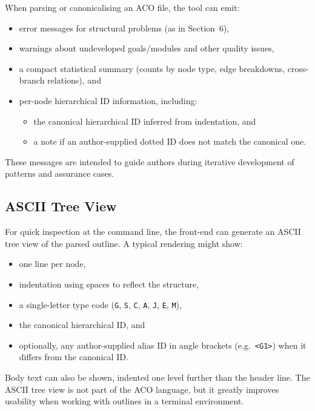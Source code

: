 \documentclass[11pt,twoside,a4paper]{article}
\begin{document}
When parsing or canonicalising an ACO file, the tool can emit:
\begin{itemize}[leftmargin=2em]
  \item error messages for structural problems (as in Section~6),
  \item warnings about undeveloped goals/modules and other quality issues,
  \item a compact statistical summary (counts by node type, edge breakdowns, cross-branch relations), and
  \item per-node hierarchical ID information, including:
    \begin{itemize}[leftmargin=1.5em]
      \item the canonical hierarchical ID inferred from indentation, and
      \item a note if an author-supplied dotted ID does not match the canonical one.
    \end{itemize}
\end{itemize}

These messages are intended to guide authors during iterative development of patterns and assurance cases.

\subsection*{ASCII Tree View}

For quick inspection at the command line, the front-end can generate an ASCII tree view of the parsed outline. A typical rendering might show:

\begin{itemize}[leftmargin=2em]
  \item one line per node,
  \item indentation using spaces to reflect the structure,
  \item a single-letter type code (\texttt{G}, \texttt{S}, \texttt{C}, \texttt{A}, \texttt{J}, \texttt{E}, \texttt{M}),
  \item the canonical hierarchical ID, and
  \item optionally, any author-supplied alias ID in angle brackets (e.g.\ \texttt{<G1>}) when it differs from the canonical ID.
\end{itemize}

Body text can also be shown, indented one level further than the header line. The ASCII tree view is not part of the ACO language, but it greatly improves usability when working with outlines in a terminal environment.
\end{document}
